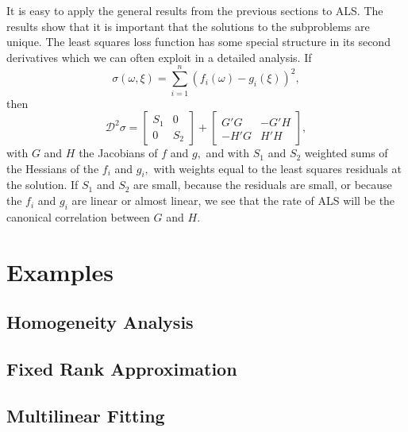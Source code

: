 \documentclass[
  12pt,
]{book}
\begin{document}
It is easy to apply the general results from the previous
sections to ALS. The results show that it is important that
the solutions to the subproblems are unique. The least squares
loss function has some special structure in its second
derivatives which we can often exploit in a detailed
analysis. If
\[
\sigma(\omega,\xi)=\sum_{i=1}^n (f_i(\omega)-g_i(\xi))^2,
\]
then
\[
\mathcal{D}^2\sigma=
\begin{bmatrix}
S_1&0\\
0&S_2
\end{bmatrix}
+
\begin{bmatrix}
G'G&-G'H\\
-H'G&H'H
\end{bmatrix},
\]
with \(G\) and \(H\) the Jacobians of \(f\) and \(g,\) and with \(S_1\)
and \(S_2\) weighted sums of the Hessians of the \(f_i\) and \(g_i,\)
with weights equal to the least squares residuals at the
solution. If \(S_1\) and \(S_2\) are small, because the residuals
are small, or because the \(f_i\) and \(g_i\) are linear or
almost linear, we see that the rate of ALS will be the
canonical correlation between \(G\) and \(H.\)

\hypertarget{alternatingleastsquares:examples}{%
\section{Examples}\label{alternatingleastsquares:examples}}

\hypertarget{alternatingleastsquares:examples:homogeneityanalysis}{%
\subsection{Homogeneity Analysis}\label{alternatingleastsquares:examples:homogeneityanalysis}}

\hypertarget{alternatingleastsquares:examples:fixedrankapproximation}{%
\subsection{Fixed Rank Approximation}\label{alternatingleastsquares:examples:fixedrankapproximation}}

\hypertarget{alternatingleastsquares:examples:multilinearfitting}{%
\subsection{Multilinear Fitting}\label{alternatingleastsquares:examples:multilinearfitting}}
\end{document}
